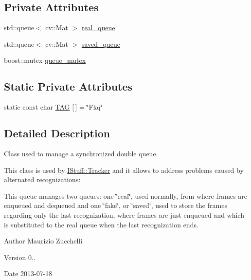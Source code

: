 \subsection*{Private Attributes}
\begin{DoxyCompactItemize}
\item 
std\-::queue$<$ cv\-::\-Mat $>$ \hyperlink{class_i_stuff_1_1_fakable_queue_a572a03879f073d8fa1babbfbf4b9d573}{real\-\_\-queue}
\item 
std\-::queue$<$ cv\-::\-Mat $>$ \hyperlink{class_i_stuff_1_1_fakable_queue_a4204d286617b6b3e9c1732946e06d0ad}{saved\-\_\-queue}
\item 
boost\-::mutex \hyperlink{class_i_stuff_1_1_fakable_queue_a463ced47c344cac9858ddb9c3a2a5fc6}{queue\-\_\-mutex}
\end{DoxyCompactItemize}
\subsection*{Static Private Attributes}
\begin{DoxyCompactItemize}
\item 
static const char \hyperlink{class_i_stuff_1_1_fakable_queue_a0934f12df566975c8811084f54aa8247}{T\-A\-G} \mbox{[}$\,$\mbox{]} = \char`\"{}Fkq\char`\"{}
\end{DoxyCompactItemize}


\subsection{Detailed Description}
Class used to manage a synchronized double queue. 

This class is used by \hyperlink{class_i_stuff_1_1_tracker}{I\-Stuff\-::\-Tracker} and it allows to address problems caused by alternated recognizations\-:\par
 This queue manages two queues\-: one \char`\"{}real\char`\"{}, used normally, from where frames are enqueued and dequeued and one \char`\"{}fake\char`\"{}, or \char`\"{}saved\char`\"{}, used to store the frames regarding only the last recognization, where frames are just enqueued and which is substituted to the real queue when the last recognization ends. \begin{DoxyAuthor}{Author}
Maurizio Zucchelli 
\end{DoxyAuthor}
\begin{DoxyVersion}{Version}
0.. 
\end{DoxyVersion}
\begin{DoxyDate}{Date}
2013-\/07-\/18 
\end{DoxyDate}


